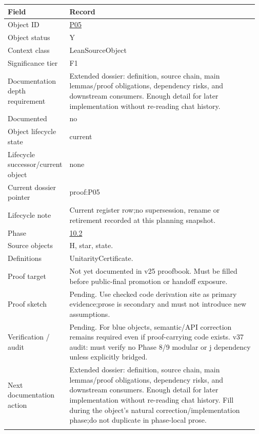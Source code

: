 \begin{longtable}{L{0.16\linewidth} L{0.81\linewidth}}
\hline
\textbf{Field} & \textbf{Record}\\
\hline
Object ID & \hyperlink{object-row-P05}{P05}\\
\hline\addlinespace[0.20em]
Object status & Y\\
\hline\addlinespace[0.20em]
Context class & LeanSourceObject\\
\hline\addlinespace[0.20em]
Significance tier & F1\\
\hline\addlinespace[0.20em]
Documentation depth requirement & Extended dossier: definition, source chain, main lemmas/\allowbreak{}proof obligations, dependency risks, and downstream consumers. Enough detail for later implementation without re-reading chat history.\\
\hline\addlinespace[0.20em]
Documented & no\\
\hline\addlinespace[0.20em]
Object lifecycle state & current\\
\hline\addlinespace[0.20em]
Lifecycle successor/\allowbreak{}current object & none\\
\hline\addlinespace[0.20em]
Current dossier pointer & proof:P05\\
\hline\addlinespace[0.20em]
Lifecycle note & Current register row;\newline no supersession, rename or retirement recorded at this planning snapshot.\\
\hline\addlinespace[0.20em]
Phase & \hyperlink{phase-row-10-2}{10.2}\\
\hline\addlinespace[0.20em]
Source objects & H, star, state.\\
\hline\addlinespace[0.20em]
Definitions & UnitarityCertificate.\\
\hline\addlinespace[0.20em]
Proof target & Not yet documented in v25 proofbook. Must be filled before public-final promotion or handoff exposure.\\
\hline\addlinespace[0.20em]
Proof sketch & Pending. Use checked code derivation site as primary evidence;\newline prose is secondary and must not introduce new assumptions.\\
\hline\addlinespace[0.20em]
Verification /\allowbreak{} audit & Pending. For blue objects, semantic/\allowbreak{}API correction remains required even if proof-carrying code exists. v37 audit: must verify no Phase 8/\allowbreak{}9 modular or j dependency unless explicitly bridged.\\
\hline\addlinespace[0.20em]
Next documentation action & Extended dossier: definition, source chain, main lemmas/\allowbreak{}proof obligations, dependency risks, and downstream consumers. Enough detail for later implementation without re-reading chat history. Fill during the object's natural correction/\allowbreak{}implementation phase;\newline do not duplicate in phase-local prose.\\
\hline\addlinespace[0.20em]
\end{longtable}
